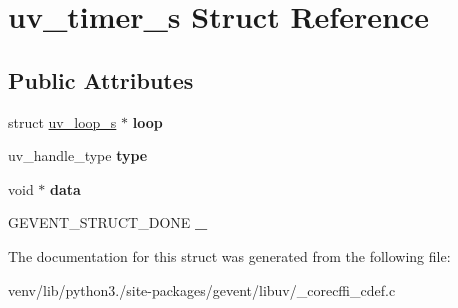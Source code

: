 \hypertarget{structuv__timer__s}{}\section{uv\+\_\+timer\+\_\+s Struct Reference}
\label{structuv__timer__s}
\subsection*{Public Attributes}
\begin{DoxyCompactItemize}
\item 
\mbox{\label{structuv__timer__s_ad5dbc1c1e9e0a6e40edba70d18fe8faa}} 
struct \hyperlink{structuv__loop__s}{uv\+\_\+loop\+\_\+s} $\ast$ {\bfseries loop}
\item 
\mbox{\label{structuv__timer__s_a2fd32216ae0088752dc0575a4e4f20b5}} 
uv\+\_\+handle\+\_\+type {\bfseries type}
\item 
\mbox{\label{structuv__timer__s_aa33184987d9957193ee229741bcca5e5}} 
void $\ast$ {\bfseries data}
\item 
\mbox{\label{structuv__timer__s_af9107c326040202514a8cad18379dd91}} 
G\+E\+V\+E\+N\+T\+\_\+\+S\+T\+R\+U\+C\+T\+\_\+\+D\+O\+NE {\bfseries \+\_\+}
\end{DoxyCompactItemize}


The documentation for this struct was generated from the following file\+:\begin{DoxyCompactItemize}
\item 
venv/lib/python3./site-\/packages/gevent/libuv/\+\_\+corecffi\+\_\+cdef.\+c\end{DoxyCompactItemize}
